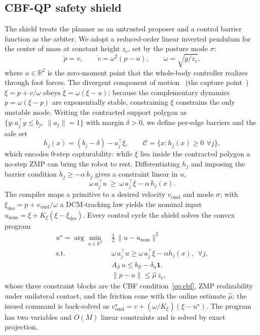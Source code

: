 \documentclass[conference]{IEEEtran}
\begin{document}
\subsection{CBF-QP safety shield}
\label{subsec:shield}
The shield treats the planner as an untrusted proposer and a control barrier
function as the arbiter. We adopt a reduced-order linear inverted pendulum for the
center of mass at constant height $z_c$, set by the posture mode $\sigma$:
\begin{equation}
\dot{p} = v, \qquad \dot{v} = \omega^2 (p - u), \qquad \omega = \sqrt{g/z_c},
\end{equation}
where $u \in \mathbb{R}^2$ is the zero-moment point that the whole-body controller
realizes through foot forces. The divergent component of
motion~\cite{englsberger2015three} (the capture point~\cite{pratt2006capture})
$\xi = p + v/\omega$ obeys $\dot\xi = \omega(\xi - u)$; because the complementary
dynamics $\dot{p} = \omega(\xi - p)$ are exponentially stable, constraining $\xi$
constrains the only unstable mode. Writing the contracted support polygon as
$\{y : a_j^\top y \le b_j,\ \lVert a_j\rVert = 1\}$ with margin $\delta>0$, we
define per-edge barriers and the safe set
\begin{equation}
h_j(x) = (b_j - \delta) - a_j^\top \xi, \qquad
\mathcal{C} = \{x : h_j(x) \ge 0\ \,\forall j\},
\end{equation}
which encodes $0$-step capturability: while $\xi$ lies inside the contracted
polygon a no-step ZMP can bring the robot to rest. Differentiating $h_j$ and
imposing the barrier condition $\dot{h}_j \ge -\alpha\,h_j$ gives a constraint
linear in $u$,
\begin{equation}
\omega\, a_j^\top u \ \ge\ \omega\, a_j^\top \xi - \alpha\, h_j(x).
\label{eq:cbf}
\end{equation}
The compiler maps a primitive to a desired velocity $v_{\mathrm{cmd}}$ and mode
$\sigma$; with $\xi_{\mathrm{des}} = p + v_{\mathrm{cmd}}/\omega$ a DCM-tracking law
yields the nominal input $u_{\mathrm{nom}} = \xi + K_\xi(\xi - \xi_{\mathrm{des}})$.
Every control cycle the shield solves the convex program
\begin{equation}
\begin{aligned}
u^\star = \arg\min_{u\in\mathbb{R}^2}\ & \tfrac12\,\lVert u - u_{\mathrm{nom}}\rVert^2 \\
\text{s.t.}\ \ & \omega\, a_j^\top u \ge \omega\, a_j^\top \xi - \alpha h_j(x),\ \ \forall j, \\
& A_{\mathcal{S}}\, u \le b_{\mathcal{S}} - \delta_u \mathbf{1}, \\
& \lVert p - u\rVert \le \hat\mu\, z_c,
\end{aligned}
\label{eq:qp}
\end{equation}
whose three constraint blocks are the CBF condition~\eqref{eq:cbf}, ZMP
realizability under unilateral contact, and the friction cone with the online
estimate $\hat\mu$; the issued command is back-solved as
$v_{\mathrm{cmd}}^\star = v + (\omega/K_\xi)(\xi - u^\star)$. The program has two
variables and $O(M)$ linear constraints and is solved by exact projection.
\end{document}
